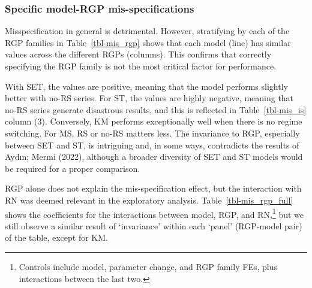\documentclass[
  letterpaper,
  DIV=11,
  numbers=noendperiod]{scrartcl}
\numberwithin{equation}{section}
\numberwithin{table}{section}
\numberwithin{figure}{section}
\begin{document}
\subsubsection{Specific model-RGP
mis-specifications}\label{sec-perf-mis-pairs}

Misspecification in general is detrimental. However, stratifying by each
of the RGP families in Table~\ref{tbl-mis_rgp} shows that each model
(line) has similar values across the different RGPs (columns). This
confirms that correctly specifying the RGP family is not the most
critical factor for performance.

With SET, the values are positive, meaning that the model performs
slightly better with no-RS series. For ST, the values are highly
negative, meaning that no-RS series generate disastrous results, and
this is reflected in Table~\ref{tbl-mis_is} column (3). Conversely, KM
performs exceptionally well when there is no regime switching. For MS,
RS or no-RS matters less. The invariance to RGP, especially between SET
and ST, is intriguing and, in some ways, contradicts the results of
Aydın; Mermi (2022), although a broader diversity of SET and ST models
would be required for a proper comparison.

\begin{table}[!htbp]

\caption{\label{tbl-mis_rgp}Models and RGP pairs mis-specification}

\centering{



}

\end{table}%

RGP alone does not explain the mis-specification effect, but the
interaction with RN was deemed relevant in the exploratory analysis.
Table~\ref{tbl-mis_rgp_full} shows the coefficients for the interactions
between model, RGP, and RN,\footnote{Controls include model, parameter
  change, and RGP family FEs, plus interactions between the last two.}
but we still observe a similar result of `invariance' within each
`panel' (RGP-model pair) of the table, except for KM.

\begin{table}[!htbp]

\caption{\label{tbl-mis_rgp_full}Models, RGPs, and RNs
mis-specification}

\centering{



}

\end{table}%
\end{document}
